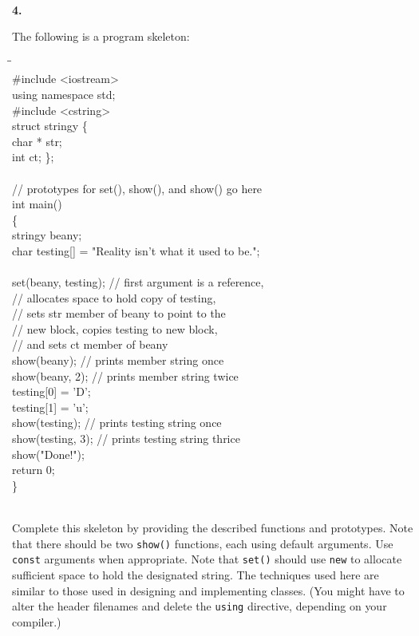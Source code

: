 \documentclass[10 pt]{amsart}
\newlength{\cwidth}
\newenvironment{cpart}[2][\cwidth]
	{\\ \phantom{\qquad}\textbf{#2. }\begin{minipage}[t]{#1}}
	{\end{minipage}}
\newcommand{\ttt}[1]{\texttt{#1}}
\begin{document}
	\begin{cpart}{4}
		The following is a program skeleton:
		{\ttfamily
			\begin{tabbing}
				\phantom{\qquad}\=\phantom{\qquad}\=\hspace{3 cm}\= \\
				\#include <iostream> \\
				using namespace std; \\
				\#include <cstring> \\
				struct stringy \{ \\
				\> 	char * str; \\
				\> 	int ct;
				\}; \\
				\\
				// prototypes for set(), show(), and show() go here \\
				int main() \\
				\{ \\
				\> 	stringy beany; \\
				\> 	char testing[] = "Reality isn't what it used to be."; \\
				\\
				\> 	set(beany, testing); \qquad // first
														argument is a reference, \\
				\> \> // allocates space to hold copy of testing, \\
				\> \> // sets str member of beany to point to the \\
				\> \> // new block, copies testing to new block, \\
				\> \> // and sets ct member of beany \\
				\> 	show(beany); \> \> // prints member string once \\
				\> 	show(beany, 2); \> \> // prints member string twice \\
				\> 	testing[0] = 'D'; \\
				\> 	testing[1] = 'u'; \\
				\> 	show(testing); \> \> // prints testing string once \\
				\> 	show(testing, 3); \> \> // prints testing string thrice \\
				\> 	show("Done!"); \\
				\> 	return 0; \\
				\}
			\end{tabbing}
		}
		\phantom{\quad} \\
		Complete this skeleton by providing the described functions
		and prototypes.
		Note that there should be two \ttt{show()} functions, each
		using default arguments.
		Use \ttt{const} arguments when appropriate.
		Note that \ttt{set()} should use \ttt{new} to allocate
		sufficient space to hold the designated string.
		The techniques used here are similar to those used in designing
		and implementing classes.
		(You might have to alter the header filenames and delete
		the \ttt{using} directive, depending on your compiler.)
	\end{cpart}
	\vspace{2ex}
\end{document}
